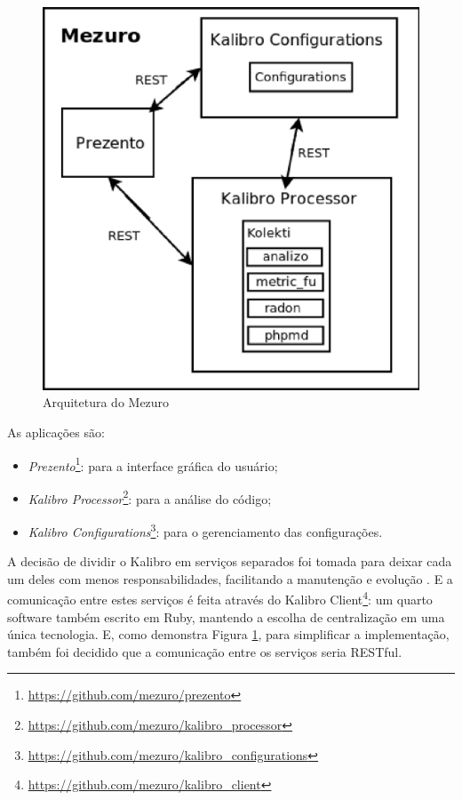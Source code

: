 \begin{figure}[!htb]
	\centering
    \includegraphics[keepaspectratio=true,scale=0.5]
    {figuras/mezuro_arch_v2.eps}
  \caption{Arquitetura do Mezuro}
	\label{fig:mezuro_arch_v2}
\end{figure}

As aplicações são:

\begin{itemize}
  \item \textit{Prezento}\footnote{\url{https://github.com/mezuro/prezento}}:
        para a interface gráfica do usuário;
  \item \textit{Kalibro Processor}\footnote{\url{https://github.com/mezuro/kalibro\_processor}}:
        para a análise do código;
  \item \textit{Kalibro Configurations}\footnote{\url{https://github.com/mezuro/kalibro\_configurations}}:
        para o gerenciamento das configurações.
\end{itemize}

A decisão de dividir o Kalibro em serviços separados foi tomada para deixar
cada um deles com menos responsabilidades, facilitando a manutenção e evolução
\cite{camarinhaOSS2015}. E a comunicação entre estes serviços é feita através
do Kalibro Client\footnote{\url{https://github.com/mezuro/kalibro\_client}}:
um quarto software também escrito em Ruby, mantendo a escolha de centralização
em uma única tecnologia. E, como demonstra Figura \ref{fig:mezuro_arch_v2},
para simplificar a implementação, também foi decidido que a comunicação entre
os serviços seria RESTful.

